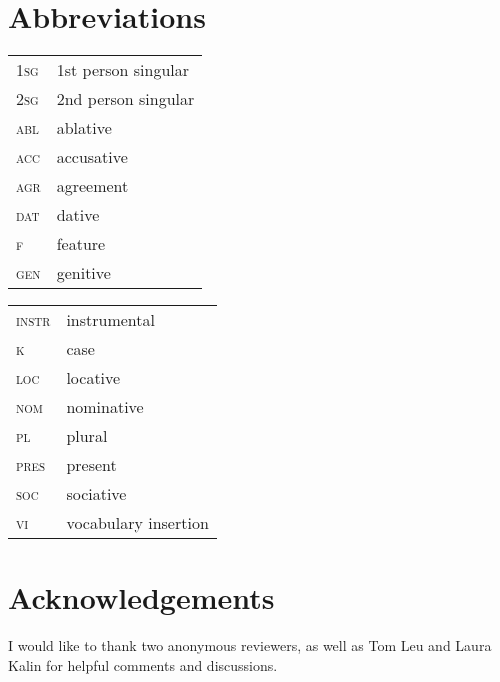 \documentclass[output=paper,colorlinks,citecolor=brown,
]{langscibook}
\begin{document}
\section*{Abbreviations}
\begin{tabularx}{.45\textwidth}{lQ}
\textsc{1sg} & 1st person singular         \\
\textsc{2sg} & 2nd person singular         \\
\textsc{abl} & ablative                 \\
\textsc{acc} & accusative         \\
\textsc{agr} & agreement      \\
\textsc{dat} & dative             \\
\textsc{f}   & feature          \\
\textsc{gen} & genitive 
\end{tabularx}
\begin{tabularx}{.45\textwidth}{lQ}
\textsc{instr} & instrumental         \\
 \textsc{k}     & case                 \\
 \textsc{loc}   & locative             \\
 \textsc{nom}   & nominative           \\
 \textsc{pl}    & plural               \\
 \textsc{pres}  & present              \\
 \textsc{soc}   & sociative            \\
 \textsc{vi}    & vocabulary insertion \\
\end{tabularx}

\section*{Acknowledgements}
I would like to thank two anonymous reviewers, as well as Tom Leu and Laura Kalin for helpful comments and discussions.

\printbibliography[heading=subbibliography,notkeyword=this]
\end{document}
